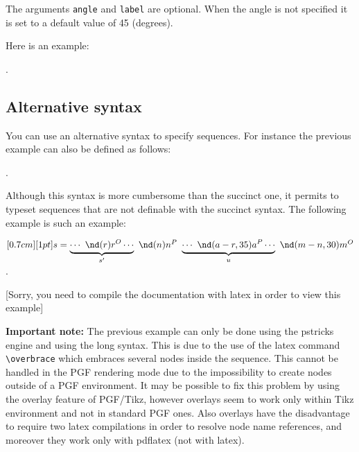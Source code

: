 The arguments  \verb|angle| and \verb|label| are optional. When the angle is not specified it is set to a default value of 45 (degrees).

Here is an example:
\begin{codeexample}[width=7cm]
.
\end{codeexample}


\subsection{Alternative syntax}
\label{subsec:altsyntax}
You can use an alternative syntax to specify sequences. For instance the previous example
can also be defined as follows:
\begin{codeexample}[width=7cm]
.
\end{codeexample}
Although this syntax is more cumbersome than the succinct one, it permits to typeset sequences that are not definable with the succinct syntax. The following example is such an example:
\ifLoadPSengine
\begin{codeexample}[width=6cm]
$\pstr[0.7cm][1pt]{ s = \underbrace{\cdots\ \nd(r){r^O}
\cdots }_{s'}\ \nd(n){n^P}
\ \underbrace{\cdots\ \nd(a-r,35){a}^P \cdots }_{u}
\ \nd(m-n,30){m}^O }$.
\end{codeexample}
\else
\vskip 10pt
[Sorry, you need to compile the documentation with latex in order to view this example]
\vskip 10pt
\fi

{\bf Important note:}
The previous example can only be done using the pstricks engine and using the long syntax. This is due to the use of the
latex command \verb|\overbrace| which embraces several nodes inside the sequence.
This cannot be handled in the PGF rendering mode due to the impossibility to create nodes outside of a PGF environment.
It may be possible to fix this problem by using the overlay feature of PGF/Tikz, however overlays seem to work only
within Tikz environment and not in standard PGF ones. Also overlays have the disadvantage to require two latex compilations in order to resolve node name references, and moreover they work only with pdflatex (not with latex).

